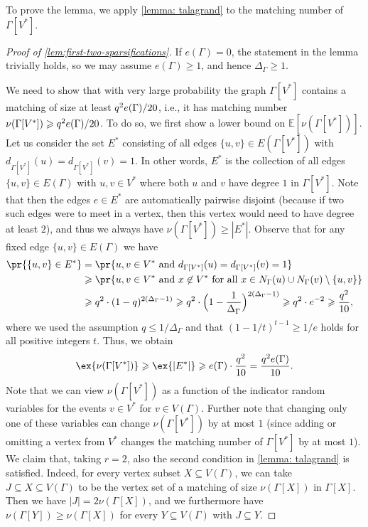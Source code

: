 \documentclass[11pt,reqno,oneside]{amsart}
\theoremstyle{definition}
\newcommand\1{\mathbf{1}}
\DeclarePairedDelimiter{\abs}{\lvert}{\rvert}
\DeclarePairedDelimiter{\paren}{\lparen}{\rparen}
\newcommand{\su}{\subseteq}
\let\geq\geqslant
\let\le\leqslant
\let\ge\geqslant
\begin{document}
To prove the lemma, we apply \cref{lemma: talagrand} to the matching number of $\Gamma[V^*]$. 
\begin{proof}[Proof of \cref{lem:first-two-sparsifications}]
If $e(\Gamma)=0$, the statement in the lemma trivially holds, so we may assume $e(\Gamma)\geq 1$, and hence $\Delta_\Gamma\geq 1$.

We need to show that with very large probability the graph $\Gamma[V^*]$ contains a matching of size at least $q^2e\paren{\Gamma}/20$, i.e., it has matching number $\nu(\Gamma[V^*])\geq q^2e\paren{\Gamma}/20$. To do so, we first show a lower bound on $\mathbb{E}[\nu(\Gamma[V^*])]$. 
       Let us consider the set $E^*$ consisting of all edges $\{u,v\}\in E(\Gamma[V^*])$  with $d_{\Gamma[V^*]}(u)=d_{\Gamma[V^*]}(v)=1$. In other words, $E^*$ is the collection of all edges $\{u,v\}\in E(\Gamma)$ with $u,v\in V^*$ where both $u$ and $v$ have degree $1$ in $\Gamma[V^*]$. Note that then the edges $e\in E^*$ are automatically pairwise disjoint (because if two such edges were to meet in a vertex, then this vertex would need to have degree at least $2$), and thus we always have $\nu(\Gamma[V^*])\ge |E^*|$.  
       Observe that for any fixed edge $\{u,v\}\in E(\Gamma)$ we have
    \begin{align*}
    \pr{\{u,v\}\in E^*}&= \pr{u,v\in V^*\text{ and }d_{\Gamma[V^*]}(u)= d_{\Gamma[V^*]}(v)= 1}\\
    &\geq \pr{u,v\in V^*\text{ and }x\not\in V^*\text{ for all }x\in N_\Gamma(u)\cup N_\Gamma(v)\setminus\{u,v\}}\\
    &\geq q^2\cdot (1-q)^{2(\Delta_\Gamma-1)}\geq q^2\cdot \Big(1-\frac{1}{\Delta_\Gamma}\Big)^{2(\Delta_\Gamma-1)} \geq q^2\cdot e^{-2}\geq \frac{q^2}{10},
    \end{align*}
    where we used the assumption $q\le 1/\Delta_\Gamma$ and that $(1-1/t)^{t-1}\geq 1/e$ holds for all positive integers $t$. Thus, we obtain
    \[\ex{\nu(\Gamma[V^*])}\ge \ex{\abs{E^*}}\geq e\paren{\Gamma}\cdot \frac{q^2}{10}=\frac{q^2e\paren{\Gamma}}{10}.\]
     Note that we can view $\nu(\Gamma[V^*])$ as a function of the  indicator random variables for the events $v\in V^*$ for $v\in V(\Gamma)$. Further note that changing only one of these variables can change $\nu(\Gamma[V^*])$ by at most $1$ (since adding or omitting a vertex from $V^*$ changes the matching number of $\Gamma[V^*]$ by at most $1$). We claim that, taking $r=2$, also the second condition in \cref{lemma: talagrand} is satisfied. Indeed, for every vertex subset $X\subseteq V(\Gamma)$, we can take $J\su X\su V(\Gamma)$ to be the vertex set of a matching of size $\nu(\Gamma[X])$ in $\Gamma[X]$. Then we have $|J|= 2\nu(\Gamma[X])$, and we furthermore have $\nu(\Gamma[Y])\ge \nu(\Gamma[X])$ for every $Y\subseteq V(\Gamma)$ with $J\subseteq Y$. 

\end{proof}
\end{document}
